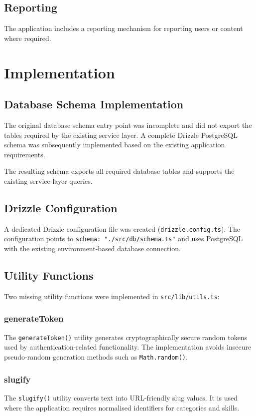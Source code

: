 \documentclass[12pt,a4paper]{report}
\begin{document}
\section{Reporting}
The application includes a reporting mechanism for reporting users or content
where required.

\chapter{Implementation}

\section{Database Schema Implementation}
The original database schema entry point was incomplete and did not export the
tables required by the existing service layer.  A complete Drizzle PostgreSQL
schema was subsequently implemented based on the existing application
requirements.

The resulting schema exports all required database tables and supports the
existing service-layer queries.

\section{Drizzle Configuration}
A dedicated Drizzle configuration file was created (\texttt{drizzle.config.ts}).
The configuration points to \texttt{schema: "./src/db/schema.ts"} and uses
PostgreSQL with the existing environment-based database connection.

\section{Utility Functions}
Two missing utility functions were implemented in \texttt{src/lib/utils.ts}:

\subsection{generateToken}
The \texttt{generateToken()} utility generates cryptographically secure random
tokens used by authentication-related functionality.  The implementation avoids
insecure pseudo-random generation methods such as \texttt{Math.random()}.

\subsection{slugify}
The \texttt{slugify()} utility converts text into URL-friendly slug values.
It is used where the application requires normalised identifiers for categories
and skills.
\end{document}
